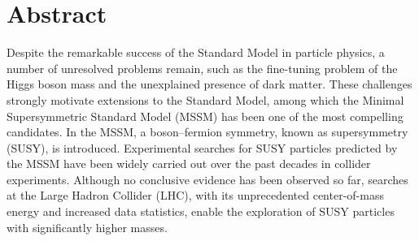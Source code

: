 \setlength{\topmargin}{-1.5cm}
\setlength{\oddsidemargin}{-0.3cm}
\setlength{\evensidemargin}{-0.3cm}
\setlength{\textwidth}{16.5cm}
\setlength{\textheight}{23cm}



%
\chapter*{Abstract} 
\thispagestyle{empty}
Despite the remarkable success of the Standard Model in particle physics, a number of unresolved problems remain, such as the fine-tuning problem of the Higgs boson mass and the unexplained presence of dark matter.
These challenges strongly motivate extensions to the Standard Model, among which the Minimal Supersymmetric Standard Model (MSSM) has been one of the most compelling candidates. In the MSSM, a boson–fermion symmetry, known as supersymmetry (SUSY), is introduced. 
Experimental searches for SUSY particles predicted by the MSSM have been widely carried out over the past decades in collider experiments. 
Although no conclusive evidence has been observed so far, searches at the Large Hadron Collider (LHC), with its unprecedented center-of-mass energy and increased data statistics, enable the exploration of SUSY particles with significantly higher masses.

